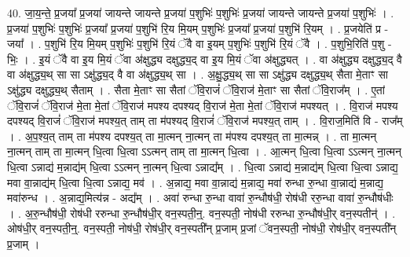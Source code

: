 \documentclass[17pt]{extarticle}
\begin{document}
40. जा॒य॒न्ते॒ प्र॒जया᳚ प्र॒जया॑ जायन्ते जायन्ते प्र॒जया॑ प॒शुभिः॑ प॒शुभिः॑ प्र॒जया॑ जायन्ते जायन्ते प्र॒जया॑ प॒शुभिः॑ । . प्र॒जया॑ प॒शुभिः॑ प॒शुभिः॑ प्र॒जया᳚ प्र॒जया॑ प॒शुभि॑ रि॒य मि॒यम् प॒शुभिः॑ प्र॒जया᳚ प्र॒जया॑ प॒शुभि॑ रि॒यम् । . प्र॒जयेति॑ प्र - जया᳚ । . प॒शुभि॑ रि॒य मि॒यम् प॒शुभिः॑ प॒शुभि॑ रि॒यं ॅवै वा इ॒यम् प॒शुभिः॑ प॒शुभि॑ रि॒यं ॅवै । . प॒शुभि॒रिति॑ प॒शु - भिः॒ । . इ॒यं ॅवै वा इ॒य मि॒यं ॅवा अ॑क्षुद्ध्य दक्षुद्ध्य॒द् वा इ॒य मि॒यं ॅवा अ॑क्षुद्ध्यत् । . वा अ॑क्षुद्ध्य दक्षुद्ध्य॒द् वै वा अ॑क्षुद्ध्य॒थ् सा सा ऽक्षु॑द्ध्य॒द् वै वा अ॑क्षुद्ध्य॒थ् सा । . अ॒क्षु॒द्ध्य॒थ् सा सा ऽक्षु॑द्ध्य दक्षुद्ध्य॒थ् सैता मे॒ताꣳ सा ऽक्षु॑द्ध्य दक्षुद्ध्य॒थ् सैताम् । . सैता मे॒ताꣳ सा सैतां ॅवि॒राजं॑ ॅवि॒राज॑ मे॒ताꣳ सा सैतां ॅवि॒राज᳚म् । . ए॒तां ॅवि॒राजं॑ ॅवि॒राज॑ मे॒ता मे॒तां ॅवि॒राज॑ मपश्य दपश्यद् वि॒राज॑ मे॒ता मे॒तां ॅवि॒राज॑ मपश्यत् । . वि॒राज॑ मपश्य दपश्यद् वि॒राजं॑ ॅवि॒राज॑ मपश्य॒त् ताम् ता म॑पश्यद् वि॒राजं॑ ॅवि॒राज॑ मपश्य॒त् ताम् । . वि॒राज॒मिति॑ वि - राज᳚म् । . अ॒प॒श्य॒त् ताम् ता म॑पश्य दपश्य॒त् ता मा॒त्मन् ना॒त्मन् ता म॑पश्य दपश्य॒त् ता मा॒त्मन्न् । . ता मा॒त्मन् ना॒त्मन् ताम् ता मा॒त्मन् धि॒त्वा धि॒त्वा ऽऽत्मन् ताम् ता मा॒त्मन् धि॒त्वा । . आ॒त्मन् धि॒त्वा धि॒त्वा ऽऽत्मन् ना॒त्मन् धि॒त्वा ऽन्नाद्य॑ म॒न्नाद्य॑म् धि॒त्वा ऽऽत्मन् ना॒त्मन् धि॒त्वा ऽन्नाद्य᳚म् । . धि॒त्वा ऽन्नाद्य॑ म॒न्नाद्य॑म् धि॒त्वा धि॒त्वा ऽन्नाद्य॒ मवा वा॒न्नाद्य॑म् धि॒त्वा धि॒त्वा ऽन्नाद्य॒ मव॑ । . अ॒न्नाद्य॒ मवा वा॒न्नाद्य॑ म॒न्नाद्य॒ मवा॑ रुन्धा रु॒न्धा वा॒न्नाद्य॑ म॒न्नाद्य॒ मवा॑रुन्ध । . अ॒न्नाद्य॒मित्य॑न्न - अद्य᳚म् । . अवा॑ रुन्धा रु॒न्धा वावा॑ रु॒न्धौष॑धी॒ रोष॑धी ररु॒न्धा वावा॑ रु॒न्धौष॑धीः । . अ॒रु॒न्धौष॑धी॒ रोष॑धी ररुन्धा रु॒न्धौष॑धी॒र् वन॒स्पती॒न्॒. वन॒स्पती॒ नोष॑धी ररुन्धा 
रु॒न्धौष॑धी॒र् वन॒स्पतीन्॑ । . ओष॑धी॒र् वन॒स्पती॒न्॒. वन॒स्पती॒ नोष॑धी॒ रोष॑धी॒र् वन॒स्पती᳚न् प्र॒जाम् प्र॒जां ॅवन॒स्पती॒ नोष॑धी॒ रोष॑धी॒र् वन॒स्पती᳚न् प्र॒जाम् । \newline
\pagebreak
{}
\end{document}
